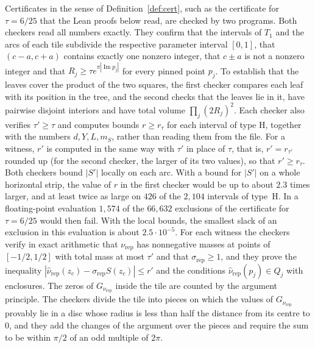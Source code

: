\documentclass[11pt]{amsart}
\theoremstyle{definition}
\theoremstyle{remark}
\numberwithin{equation}{section}
\newcommand{\im}{\operatorname{Im}}
\newcommand{\TabLeafE}{66{,}632}
\newcommand{\StripRatio}{2.3}
\newcommand{\StripTwice}{426}
\newcommand{\StripH}{2{,}104}
\newcommand{\StripFail}{1{,}574}
\newcommand{\StripSlack}{2.5\cdot10^{-5}}
\begin{document}
Certificates in the sense of Definition~\ref{def:cert}, such as the certificate for $\tau=6/25$ that the Lean proofs below read, are checked by two programs. Both checkers read all numbers exactly. They confirm that the intervals of $T_1$ and the arcs of each tile subdivide the respective parameter interval $[0,1]$, that $(c-a,c+a)$ contains exactly one nonzero integer, that $c\pm a$ is not a nonzero integer and that $R_j\ge\tau e^{\pi|\im p_j|}$ for every pinned point $p_j$. To establish that the leaves cover the product of the two squares, the first checker compares each leaf with its position in the tree, and the second checks that the leaves lie in it, have pairwise disjoint interiors and have total volume $\prod_j(2R_j)^2$. Each checker also verifies $\tau'\ge\tau$ and computes bounds $r\ge r_\tau$ for each interval of type H, together with the numbers $d,Y,L,m_S$, rather than reading them from the file. For a witness, $r'$ is computed in the same way with $\tau'$ in place of $\tau$, that is, $r'=r_{\tau'}$ rounded up (for the second checker, the larger of its two values), so that $r'\ge r_\tau$. Both checkers bound $|S'|$ locally on each arc. With a bound for $|S'|$ on a whole horizontal strip, the value of $r$ in the first checker would be up to about $\StripRatio$ times larger, and at least twice as large on $\StripTwice$ of the $\StripH$ intervals of type~H. In a floating-point evaluation $\StripFail$ of the $\TabLeafE$ exclusions of the certificate for $\tau=6/25$ would then fail. With the local bounds, the smallest slack of an exclusion in this evaluation is about $\StripSlack$. For each witness the checkers verify in exact arithmetic that $\nu_{\mathrm{rep}}$ has nonnegative masses at points of $[-1/2,1/2]$ with total mass at most $\tau'$ and that $\sigma_{\mathrm{rep}}\ge1$, and they prove the inequality $|\hat\nu_{\mathrm{rep}}(z_c)-\sigma_{\mathrm{rep}}S(z_c)|\le r'$ and the conditions $\hat\nu_{\mathrm{rep}}(p_j)\in Q_j$ with enclosures. The zeros of $G_{\nu_{\mathrm{rep}}}$ inside the tile are counted by the argument principle. The checkers divide the tile into pieces on which the values of $G_{\nu_{\mathrm{rep}}}$ provably lie in a disc whose radius is less than half the distance from its centre to $0$, and they add the changes of the argument over the pieces and require the sum to be within $\pi/2$ of an odd multiple of $2\pi$.
\end{document}
